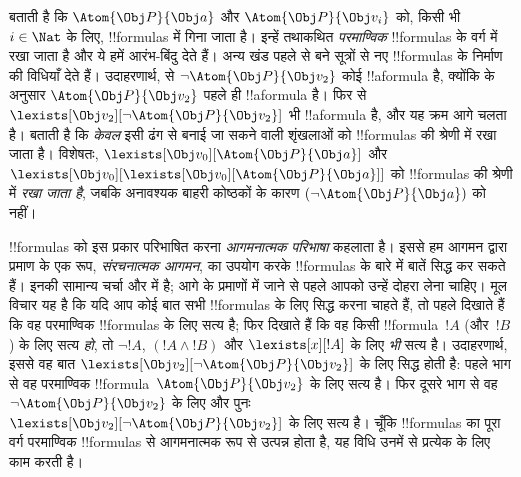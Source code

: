 \documentclass[../../../include/open-logic-section]{subfiles}
\begin{document}
 बताती है कि $\Atom{\Obj P}{\Obj a}$ और
$\Atom{\Obj P}{\Obj v_i}$ को, किसी भी $i \in
\Nat$ के लिए, !!{formula}s में गिना जाता है। इन्हें तथाकथित
\emph{परमाण्विक} !!{formula}s के वर्ग में रखा जाता है और ये हमें आरंभ-बिंदु
देते हैं। अन्य खंड पहले से बने सूत्रों से नए !!{formula}s के निर्माण की विधियाँ देते हैं। उदाहरणार्थ,
 से $\lnot \Atom{\Obj P}{\Obj v_2}$ कोई !!a{formula} है,
क्योंकि  के अनुसार $\Atom{\Obj P}{\Obj v_2}$ पहले ही
!!a{formula} है। फिर  से
$\lexists[\Obj v_2][\lnot \Atom{\Obj P}{\Obj v_2}]$ भी !!a{formula} है,
और यह क्रम आगे चलता है।
 बताती है कि \emph{केवल} इसी ढंग से बनाई जा सकने वाली
शृंखलाओं को !!{formula}s की श्रेणी में रखा जाता है। विशेषतः,
$\lexists[\Obj v_0][\Atom{\Obj P}{\Obj a}]$ और $\lexists[\Obj
  v_0][\lexists[\Obj v_0][\Atom{\Obj P}{\Obj a}]]$ को !!{formula}s की श्रेणी में
\emph{रखा जाता है}, जबकि अनावश्यक बाहरी कोष्ठकों के
कारण $(\lnot \Atom{\Obj P}{\Obj a})$ को नहीं।

!!{formula}s को इस प्रकार परिभाषित करना \emph{आगमनात्मक परिभाषा} कहलाता है।
इससे हम आगमन द्वारा प्रमाण के एक रूप, \emph{संरचनात्मक आगमन}, का उपयोग करके
!!{formula}s के बारे में बातें सिद्ध कर सकते हैं। इनकी सामान्य चर्चा
 और  में है; आगे के
प्रमाणों में जाने से पहले आपको उन्हें दोहरा लेना चाहिए। मूल विचार यह है कि
यदि आप कोई बात सभी !!{formula}s के लिए सिद्ध करना चाहते हैं, तो पहले दिखाते
हैं कि वह परमाण्विक !!{formula}s के लिए सत्य है; फिर दिखाते हैं कि वह किसी
!!{formula}~$!A$ (और~$!B$) के लिए सत्य \emph{हो}, तो $\lnot !A$,
$(!A \land !B)$ और $\lexists[x][!A]$ के लिए \emph{भी} सत्य है। उदाहरणार्थ,
इससे वह बात
$\lexists[\Obj v_2][\lnot \Atom{\Obj P}{\Obj v_2}]$ के लिए सिद्ध होती है:
पहले भाग से वह परमाण्विक !!{formula}~$\Atom{\Obj
P}{\Obj v_2}$ के लिए सत्य है। फिर दूसरे भाग से वह $\lnot \Atom{\Obj
P}{\Obj v_2}$ के लिए और पुनः
$\lexists[\Obj v_2][\lnot \Atom{\Obj P}{\Obj v_2}]$ के लिए सत्य है। चूँकि
!!{formula}s का पूरा वर्ग परमाण्विक !!{formula}s से आगमनात्मक रूप से उत्पन्न होता है,
यह विधि उनमें से प्रत्येक के लिए काम करती है।
\end{document}
